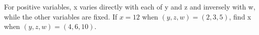 For positive variables, x varies directly with each of y and z and inversely with w, while the other variables are fixed. If $x=12$ when $(y,z,w)=(2,3,5)$, find x when $(y,z,w)=(4,6,10)$.
